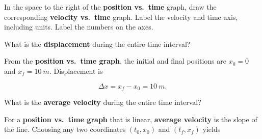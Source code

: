 \documentclass[addpoints]{exam}
\begin{document}
\begin{questions}
\begin{figure}[h!]
\end{figure}

\question \label{ques:runner_start} 
In the space to the right of the \textbf{position vs.~time} graph, draw the corresponding \textbf{velocity vs.~time} graph. Label the velocity and time axis, including units. Label the numbers on the axes. 

\begin{solution}

\end{solution}


\question 
What is the \textbf{displacement} during the entire time interval?

\begin{solution}
From the \textbf{position vs.~time graph}, the initial and final positions are $x_0=0$ and $x_f = \SI{10}{m}$. Displacement is

\begin{equation*}
    \Delta{x} = x_f - x_0 = \SI{10}{m}.
\end{equation*}
\end{solution}

\question \label{ques:runner_end} 
What is the \textbf{average velocity} during the entire time interval?

\begin{solution}
For a \textbf{position vs.~time graph} that is linear, \textbf{average velocity} is the slope of the line. Choosing any two coordinates $(t_0,x_0)$ and $(t_f,x_f)$ yields


\end{solution}
\end{questions}
\end{document}

